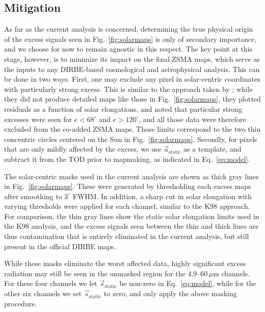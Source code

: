 \documentclass{aa}
\newcommand{\s}[0]{\vec{s}}
\renewcommand{\a}[0]{\vec{a}}
\begin{document}
\subsection{Mitigation}

As far as the current analysis is concerned, determining the true
physical origin of the excess {signals seen in
  Fig.~\ref{fig:solarmaps}} is only of secondary importance, and we
choose for now to remain agnostic in this respect. The key point at
this stage, however, is to minimize its impact on the final ZSMA maps,
which serve as the inputs to any DIRBE-based cosmological and
astrophysical analysis. This can be done in two ways. First, one may
exclude any pixel in solar-centric coordinates with particularly
strong excess. This is similar to the approach taken by
\citet{kelsall1998}; while they did not produce detailed maps like
those in Fig.~\ref{fig:solarmaps}, they plotted residuals as a
function of solar elongations, and noted that particular strong
excesses were seen for $e<68^{\circ}$ and $e>120^{\circ}$, and all
those data were therefore excluded from the co-added ZSMA maps. Those
limits correspond to {the two thin} concentric circles centered on the Sun in
Fig.~\ref{fig:solarmaps}. Secondly, for pixels that are only mildly
affected by the excess, we use $\a_{\mathrm{static}}$ as a template,
and subtract it from the TOD prior to mapmaking, as indicated in
Eq.~\eqref{eq:model}.


The solar-centric masks used in the current analysis are shown as
thick gray lines in Fig.~\ref{fig:solarmaps}. These were generated by
thresholding each excess maps after smoothing to $3^{\circ}$ FWHM. In
addition, a sharp cut in solar elongation with varying thresholds were
applied for each channel, similar to the K98 approach. For comparison,
the thin gray lines show the static solar elongation limits used in the
K98 analysis, and the excess signals seen between the thin and thick
lines are thus contamination that is entirely eliminated in the
current analysis, but still present in the official DIRBE maps.

%


While these masks eliminate the worst affected data,
highly significant excess radiation may still be seen in the unmasked
region for the 4.9--60$\,\mu$m channels. For these four channels we
let $\s_{\mathrm{static}}$ be non-zero in Eq.~\eqref{eq:model}, while
for the other six channels we set $\s_{\mathrm{static}}$ to zero, and
only apply the above masking procedure. 
\end{document}
